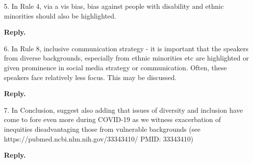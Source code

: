 \documentclass{article}
\newenvironment{Reply}{\noindent\color{BlueViolet}\textbf{Reply.}}{\vspace{1em}}
\begin{document}
5. In Rule 4, via a vis bias, bias against people with disability and ethnic minorities should also be highlighted.

\begin{Reply}


\end{Reply}

6. In Rule 8, inclusive communication strategy - it is important that the speakers from diverse backgrounds, especially from ethnic minorities etc are highlighted or given prominence in social media strategy or communication. Often, these speakers face relatively less focus. This may be discussed.

\begin{Reply}
   
\end{Reply}

7. In Conclusion, suggest also adding that issues of diversity and inclusion have come to fore even more during COVID-19 as we witness exacerbation of inequities disadvantaging those from vulnerable backgrounds (see https://pubmed.ncbi.nlm.nih.gov/33343410/
PMID: 33343410)

\begin{Reply}
\end{Reply}
\end{document}
